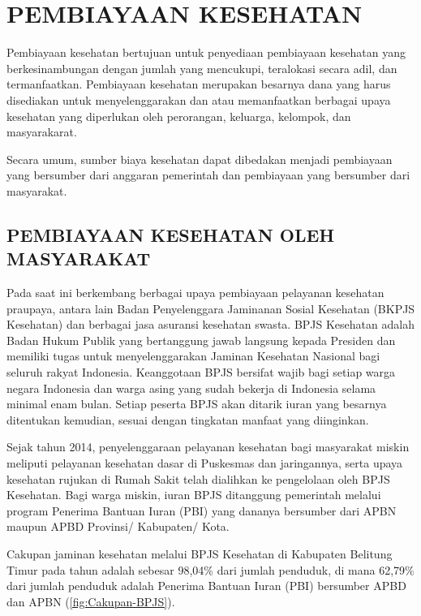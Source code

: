 \chapter{PEMBIAYAAN KESEHATAN}
Pembiayaan kesehatan bertujuan untuk penyediaan pembiayaan kesehatan yang berkesinambungan dengan jumlah yang mencukupi, teralokasi secara adil, dan termanfaatkan. Pembiayaan kesehatan merupakan besarnya dana yang harus disediakan untuk menyelenggarakan dan atau memanfaatkan berbagai upaya kesehatan yang diperlukan oleh perorangan, keluarga, kelompok, dan masyarakarat.

Secara umum, sumber biaya kesehatan dapat dibedakan menjadi pembiayaan yang bersumber dari anggaran pemerintah dan pembiayaan yang bersumber dari masyarakat.

\section[PEMBIAYAAN OLEH MASYARAKAT]{PEMBIAYAAN KESEHATAN OLEH MASYARAKAT}
Pada saat ini berkembang berbagai upaya pembiayaan pelayanan kesehatan praupaya, antara lain Badan Penyelenggara Jaminanan Sosial Kesehatan (BKPJS Kesehatan) dan berbagai jasa asuransi kesehatan swasta. BPJS Kesehatan adalah Badan Hukum Publik yang bertanggung jawab langsung kepada Presiden dan memiliki tugas untuk menyelenggarakan Jaminan Kesehatan Nasional bagi seluruh rakyat Indonesia. Keanggotaan BPJS bersifat wajib bagi setiap warga negara Indonesia dan warga asing yang sudah bekerja di Indonesia selama minimal enam bulan. Setiap peserta BPJS akan ditarik iuran yang besarnya ditentukan kemudian, sesuai dengan tingkatan manfaat yang diinginkan.

Sejak tahun 2014, penyelenggaraan pelayanan kesehatan bagi masyarakat miskin meliputi pelayanan kesehatan dasar di Puskesmas dan jaringannya, serta upaya kesehatan rujukan di Rumah Sakit telah dialihkan ke pengelolaan oleh BPJS Kesehatan. Bagi warga miskin, iuran BPJS ditanggung pemerintah melalui program Penerima Bantuan Iuran (PBI) yang dananya bersumber dari APBN maupun APBD Provinsi/ Kabupaten/ Kota.

Cakupan jaminan kesehatan melalui BPJS Kesehatan di Kabupaten Belitung Timur pada tahun \tP adalah sebesar 98,04\% dari jumlah penduduk, di mana 62,79\%  dari jumlah penduduk adalah Penerima Bantuan Iuran (PBI) bersumber APBD dan APBN (\autoref{fig:Cakupan-BPJS}).

